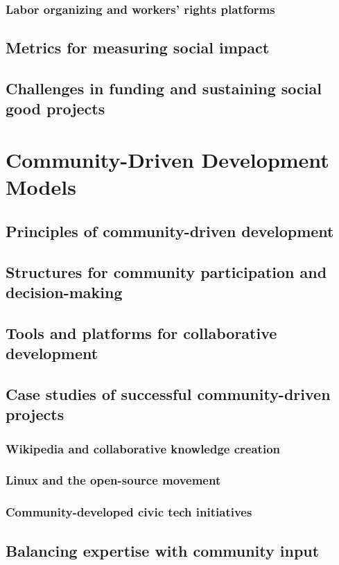 \subsubsection{Labor organizing and workers' rights platforms}
\subsection{Metrics for measuring social impact}
\subsection{Challenges in funding and sustaining social good projects}

\newpage

\section{Community-Driven Development Models}
\subsection{Principles of community-driven development}
\subsection{Structures for community participation and decision-making}
\subsection{Tools and platforms for collaborative development}
\subsection{Case studies of successful community-driven projects}
\subsubsection{Wikipedia and collaborative knowledge creation}
\subsubsection{Linux and the open-source movement}
\subsubsection{Community-developed civic tech initiatives}
\subsection{Balancing expertise with community input}
